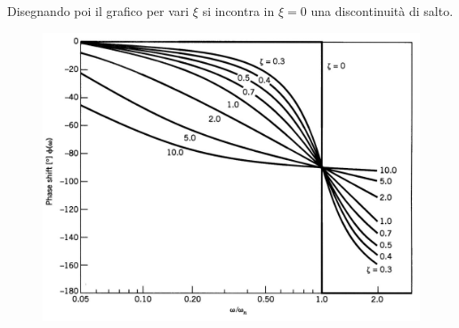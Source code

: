 \documentclass[a4paper, 15pt]{article}
\begin{document}
\begin{adjustwidth}{2in}{}
			Disegnando poi il grafico per vari $\xi$ si incontra in $\xi=0$ una discontinuità di salto.			
\begin{figure}[H]
	\centering
	\includegraphics[width=0.5\linewidth]{fig/imag7}
	\label{fig:imag7}
\end{figure}
\end{adjustwidth}
\newpage
\end{document}
